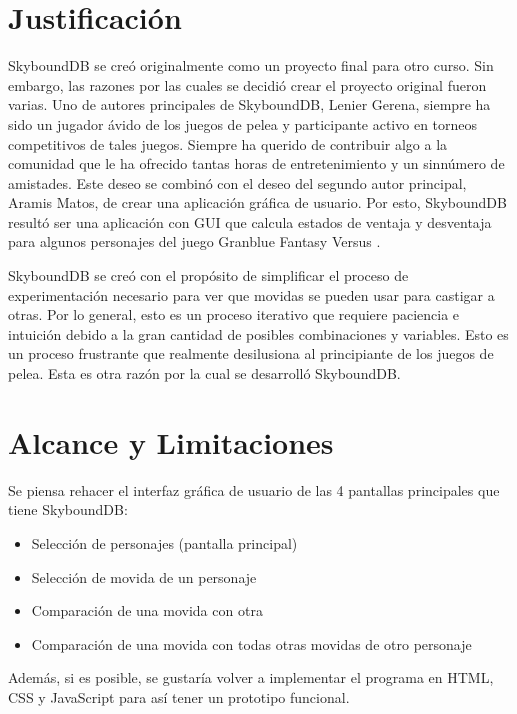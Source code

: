 \section{Justificación}
SkyboundDB se creó originalmente como un proyecto final para otro curso. Sin embargo, las razones por las cuales se decidió crear el proyecto original fueron varias. Uno de autores principales de SkyboundDB, Lenier Gerena, siempre ha sido un jugador ávido de los juegos de pelea y participante activo en torneos competitivos de tales juegos. Siempre ha querido de contribuir algo a la comunidad que le ha ofrecido tantas horas de entretenimiento y un sinnúmero de amistades. Este deseo se combinó con el deseo del segundo autor principal, Aramis Matos, de crear una aplicación gráfica de usuario. Por esto, SkyboundDB resultó ser una aplicación con GUI que calcula estados de ventaja y desventaja para algunos personajes del juego Granblue Fantasy Versus \cite{noauthor_granblue_2022}.

SkyboundDB
se creó con el propósito de simplificar el proceso de experimentación necesario para ver que movidas se pueden usar para castigar a otras. Por lo general, esto es un proceso iterativo que requiere paciencia e intuición debido a la gran cantidad de posibles combinaciones y variables. Esto es un proceso frustrante que realmente desilusiona al principiante de los juegos de pelea. Esta es otra razón por la cual se desarrolló SkyboundDB.

\section{Alcance y Limitaciones}

Se piensa rehacer el interfaz gráfica de usuario de las 4 pantallas principales que tiene SkyboundDB:
\begin{itemize}
    \item Selección de personajes (pantalla principal)
    \item Selección de movida de un personaje
    \item Comparación de una movida con otra
    \item Comparación de una movida con todas otras movidas de otro personaje
\end{itemize}

Además, si es posible, se gustaría volver a implementar el programa en HTML, CSS y JavaScript para así tener un prototipo funcional.


